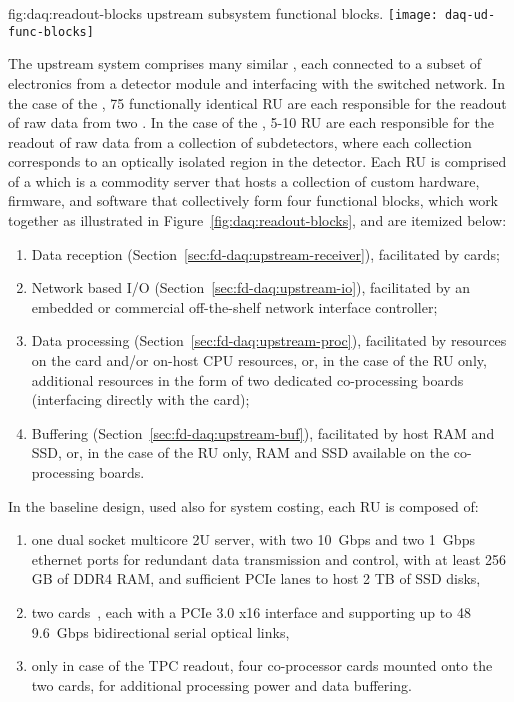 \begin{dunefigure}{fig:daq:readout-blocks}{ upstream
     subsystem functional blocks.}
  \texttt{[image: daq-ud-func-blocks]}
\end{dunefigure}

The upstream  system comprises many similar , each
connected to a subset of electronics from a detector module and
interfacing with the  switched network. In the case of the
, 75 functionally identical RU are each responsible for the readout of raw data from two
. In the case of the , 5-10 RU are each responsible for the
readout of raw data from a collection of  subdetectors, where each
collection corresponds to an optically isolated region in the
detector. 
Each RU is comprised of a  which is a commodity server that hosts a
collection of custom hardware, 
firmware, and software that collectively form four functional blocks,
which work together 
as illustrated in Figure~\ref{fig:daq:readout-blocks}, and are
itemized below:

\begin{enumerate}
\item Data reception (Section~\ref{sec:fd-daq:upstream-receiver}), facilitated by  cards;
\item Network based I/O (Section~\ref{sec:fd-daq:upstream-io}), facilitated by an embedded or commercial off-the-shelf network interface controller;
\item Data processing (Section~\ref{sec:fd-daq:upstream-proc}), facilitated by  resources on the 
  card and/or on-host CPU resources, or, in the case of the  RU only,
  additional  resources in the form of two dedicated co-processing
  boards (interfacing directly with the  card); 
\item Buffering (Section~\ref{sec:fd-daq:upstream-buf}), facilitated by host RAM and SSD, or, in
  the case of the  RU only, RAM
  and SSD available on the co-processing boards.
\end{enumerate}

In the baseline design, used also for system costing, each RU is composed of:
\begin{enumerate}
\item one dual socket multicore 2U server, with two \SI{10}{Gbps} and two \SI{1}{Gbps} ethernet ports for redundant data transmission and control, with at least 256 GB of DDR4 RAM, and sufficient PCIe lanes to host 2 TB of SSD disks,
\item two  cards~\cite{atlas-felix}, each with a PCIe 3.0 x16 interface and supporting up to 48 \SI{9.6}{Gbps} bidirectional serial optical links,
\item only in case of the TPC readout, four co-processor cards mounted onto the two  cards, for additional processing power and data buffering.

\end{enumerate}

